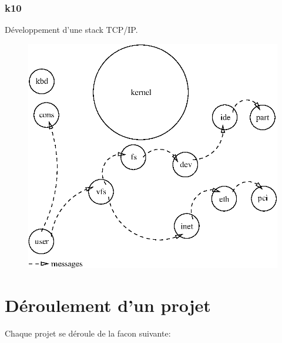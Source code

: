 \documentclass[10pt,a4wide]{article}
\begin{document}
\newpage

\subsubsection{k10}

D\'eveloppement d'une stack TCP/IP.

\vspace{5cm}

\begin{figure}[h]
\centerline{\includegraphics{figures/k10.eps}}
\end{figure}

\newpage

\section{D\'eroulement d'un projet}

Chaque projet se d\'eroule de la facon suivante:
\end{document}

